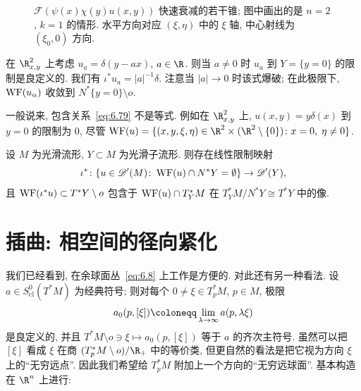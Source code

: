 \begin{figure}[htbp]
\centering
\drawFigSixFive
\caption{$\mathcal{F}(\psi(x)\chi(y)u(x, y))$ 快速衰减的若干锥; 图中画出的是 $n = 2$, $k = 1$ 的情形. 水平方向对应 $(\xi, \eta)$ 中的 $\xi$ 轴, 中心射线为 $(\xi_0, 0)$ 方向.}
\label{fig:6.5}
\end{figure}

\begin{example}\label{eg:6.45}
在 $\R^2_{x, y}$ 上考虑 $u_a = \delta(y - a x)$, $a \in \R$. 则当 $a \neq 0$ 时 $u_a$ 到 $Y = \{y = 0\}$ 的限制是良定义的. 我们有 $\iota^* u_a = |a|^{-1}\delta$. 注意当 $|a| \to 0$ 时该式爆破; 在此极限下, $\operatorname{WF}(u_\alpha)$ 收敛到 $N^*\{y = 0\} \setminus o$.
\end{example}

\begin{example}[限制的波前集]\label{eg:6.46}
一般说来, 包含关系~\eqref{eq:6.79} 不是等式. 例如在 $\R^2_{x, y}$ 上, $u(x, y) = y \delta(x)$ 到 $y = 0$ 的限制为 0, 尽管 $\WF(u) = \{(x, y, \xi, \eta) \in \R^2 \times (\R^2 \setminus \{0\}) \colon x = 0, \; \eta \neq 0\}$.
\end{example}

\begin{corollary}[分布到子流形的限制]\label{cor:6.47}
设 $M$ 为光滑流形, $Y \subset M$ 为光滑子流形. 则存在线性限制映射
\begin{equation}\label{eq:6.87}
    \iota^* \colon \{u \in \mathscr{D}'(M) \colon \operatorname{WF}(u) \cap N^* Y = \emptyset\} \to \mathscr{D}'(Y),
\end{equation}
且 $\operatorname{WF}(\iota^* u) \subset T^* Y \setminus o$ 包含于 $\operatorname{WF}(u) \cap T^*_Y M$ 在 $T^*_Y M / N^* Y \cong T^* Y$ 中的像.
\end{corollary}



\section{插曲: 相空间的径向紧化}\label{sec:6.5}
%
%

我们已经看到, 在余球面丛~\eqref{eq:6.8} 上工作是方便的. 对此还有另一种看法. 设 $a \in S^0_{\mathrm{cl}}(T^* M)$ 为经典符号; 则对每个 $0 \neq \xi \in T^*_p M$, $p \in M$, 极限
\begin{equation}\label{eq:6.88}
    a_0(p, [\xi]) \defeq \lim_{\lambda \to \infty} a(p, \lambda \xi)
\end{equation}
是良定义的, 并且 $T^* M \setminus o \ni \xi \mapsto a_0(p, [\xi])$ 等于 $a$ 的齐次主符号. 虽然可以把 $[\xi]$ 看成 $\xi$ 在商 $(T^*_p M \setminus o)/\R_+$ 中的等价类, 但更自然的看法是把它视为方向 $\xi$ 上的``无穷远点''. 因此我们希望给 $T^*_p M$ 附加上一个方向的``无穷远球面''. 基本构造在 $\R^n$ 上进行:

